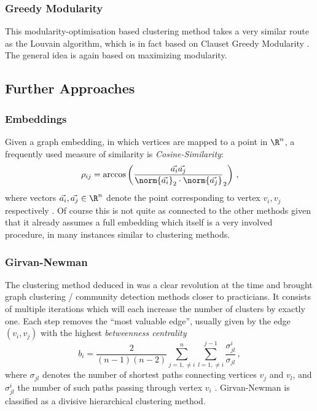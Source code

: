 \documentclass[12pt, a4paper]{article}
\begin{document}
  \subsubsection{Greedy Modularity}
  This modularity-optimisation based clustering method takes a very similar route as the Louvain algorithm, which is in fact based on Clauset Greedy Modularity \parencite{clauset-greedy-modularity}.
  The general idea is again based on maximizing modularity.

  \subsection{Further Approaches}
  \subsubsection{Embeddings}
  Given a graph embedding, in which vertices are mapped to a point in $\R^n$, a frequently used measure of similarity is \textit{Cosine-Similarity}:
  $$\rho_{ij} = \arccos\left(\frac{\vec{a_i} \vec{a_j}}{\norm{\vec{a_i}}_2 \cdot \norm{\vec{a_j}}}_2\right)\,,$$
  where vectors $\vec{a_i}, \vec{a_j} \in \R^n$ denote the point corresponding to vertex $v_i, v_j$ respectively \parencite{fortunato}.
  Of course this is not quite as connected to the other methods given that it already assumes a full embedding which itself is a very involved procedure, in many instances similar to clustering methods.

  \subsubsection{Girvan-Newman}
  The clustering method deduced in \cite{girvan-newman} was a clear revolution at the time and brought graph clustering / community detection methods closer to practicians.
  It consists of multiple iterations which will each increase the number of clusters by exactly one. Each step removes the ``most valuable edge'', usually given by the edge $(v_i, v_j)$ with the highest \textit{betweenness centrality} $$b_i = \frac{2}{(n-1)(n-2)} \sum_{j=1, \neq i}^n \sum_{l=1, \neq i}^{j-1} \frac{\sigma_{jl}^{i}}{\sigma_{jl}}\,,$$ where $\sigma_{jl}$ denotes the number of shortest paths connecting vertices $v_j$ and $v_l$, and $\sigma_{jl}^i$ the number of such paths passing through vertex $v_i$ \parencite{grindrod-lecture-notes}.
  Girvan-Newman is classified as a divisive hierarchical clustering method.
\end{document}
